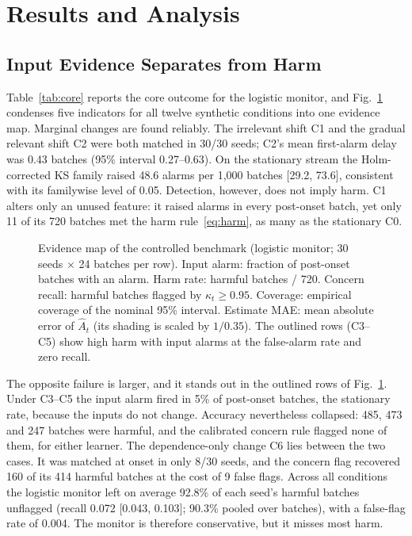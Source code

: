 \section{Results and Analysis}
\label{sec:results}



\subsection{Input Evidence Separates from Harm}
\label{sec:res-core}
Table~\ref{tab:core} reports the core outcome for the logistic monitor, and
Fig.~\ref{fig:heatmap} condenses five indicators for all twelve synthetic conditions
into one evidence map. Marginal changes are found reliably. The irrelevant shift C1
and the gradual relevant shift C2 were both matched in 30/30 seeds; C2's mean
first-alarm delay was 0.43 batches (95\% interval 0.27--0.63). On the stationary stream
the Holm-corrected KS family raised 48.6 alarms per 1,000 batches [29.2, 73.6],
consistent with its familywise level of 0.05. Detection, however, does not imply harm.
C1 alters only an unused feature: it raised alarms in every post-onset batch, yet only
11 of its 720 batches met the harm rule~\eqref{eq:harm}, as many as the stationary C0.

\begin{figure}[t]
\centering

\caption{Evidence map of the controlled benchmark (logistic monitor; 30 seeds $\times$ 24 batches per row). Input alarm: fraction of post-onset batches with an alarm. Harm rate: harmful batches / 720. Concern recall: harmful batches flagged by $\kappa_t\ge0.95$. Coverage: empirical coverage of the nominal 95\% interval. Estimate MAE: mean absolute error of $\hat A_t$ (its shading is scaled by $1/0.35$). The outlined rows (C3--C5) show high harm with input alarms at the false-alarm rate and zero recall.}
\label{fig:heatmap}
\end{figure}

The opposite failure is larger, and it stands out in the outlined rows of
Fig.~\ref{fig:heatmap}. Under C3--C5 the input alarm fired in 5\% of post-onset
batches, the stationary rate, because the inputs do not change. Accuracy nevertheless
collapsed: 485, 473 and 247 batches were harmful, and the calibrated concern rule
flagged none of them, for either learner. The dependence-only change C6 lies between
the two cases. It was matched at onset in only 8/30 seeds, and the concern flag
recovered 160 of its 414 harmful batches at the cost of 9 false flags. Across all
conditions the logistic monitor left on average 92.8\% of each seed's harmful batches
unflagged (recall 0.072 [0.043, 0.103]; 90.3\% pooled over batches), with a false-flag
rate of 0.004. The monitor is therefore conservative, but it misses most harm.

